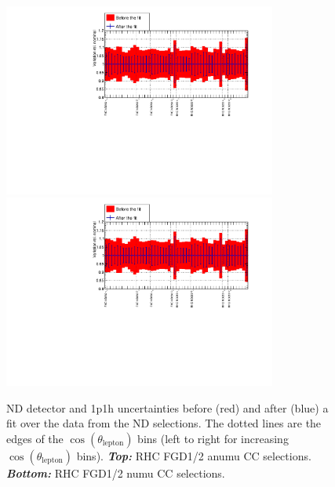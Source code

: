 \begin{figure}[ht]
  \begin{center}
    \includegraphics[width=0.8\textwidth,page=6]{images/BANFF/OutputAsimov_histos.pdf}\\
    \includegraphics[width=0.8\textwidth,page=7]{images/BANFF/OutputAsimov_histos.pdf}
    \caption[ND280 detector and 1p1h uncertainties before and after a
    fit to the Asimov data set of the RHC (anti-)$\nu_\mu$ and
    (anti-)$\nu_e$ ND280 selections]{\Gls{ND} detector and 1p1h
      uncertainties before (red) and after (blue) a fit over the data
      from the \Gls{ND} selections. The dotted lines are the edges of
      the $\cos(\theta_\text{lepton})$ bins (left to right for
      increasing $\cos(\theta_\text{lepton})$
      bins). \textbf{\textit{Top:}} \Gls{RHC} \Gls{FGD}1/2 \Gls{anumu}
      \Gls{CC} selections. \textbf{\textit{Bottom:}} \Gls{RHC}
      \Gls{FGD}1/2 \Gls{numu} \Gls{CC} selections.}
    \label{fig:asimovdet2}
  \end{center}
\end{figure}


